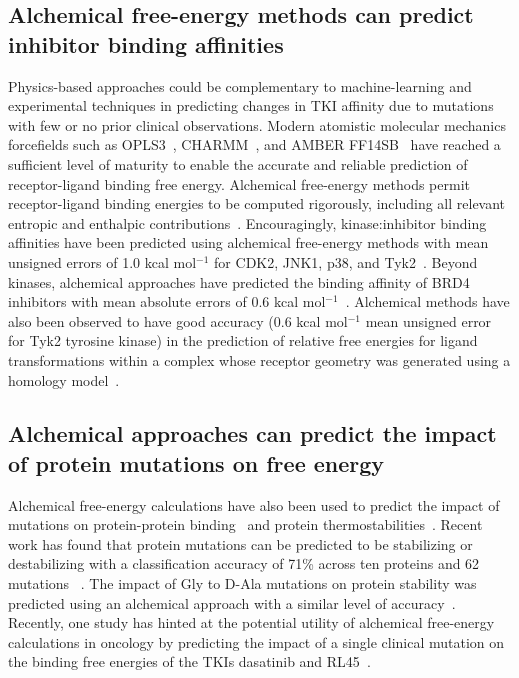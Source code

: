 \documentclass[phd,tocprelim]{cornell}
\begin{document}
\subsection{Alchemical free-energy methods can predict inhibitor binding affinities}
    Physics-based approaches could be complementary to machine-learning and experimental techniques in predicting changes in TKI affinity due to mutations with few or no prior clinical observations.
    Modern atomistic molecular mechanics forcefields such as OPLS3~\citep{Harder:J.Chem.TheoryComput.:2016}, CHARMM~\citep{Huang:J.Comput.Chem.:2013}, and AMBER FF14SB~\citep{Maier:J.Chem.TheoryComput.:2015} have reached a sufficient level of maturity to enable the accurate and reliable prediction of receptor-ligand binding free energy.
    Alchemical free-energy methods permit receptor-ligand binding energies to be computed rigorously, including all relevant entropic and enthalpic contributions~\citep{Chodera:Curr.Opin.Struct.Biol.:2011}.
    Encouragingly, kinase:inhibitor binding affinities have been predicted using alchemical free-energy methods with mean unsigned errors of 1.0 kcal mol$^{-1}$ for CDK2, JNK1, p38, and Tyk2~\citep{Wang:J.Am.Chem.Soc.:2015,abel2017accelerating}.
    Beyond kinases, alchemical approaches have predicted the binding affinity of BRD4 inhibitors with mean absolute errors of 0.6 kcal mol$^{-1}$~\citep{Aldeghi:ChemSci:2016}.
	Alchemical methods have also been observed to have good accuracy (0.6 kcal mol$^{-1}$ mean unsigned error for Tyk2 tyrosine kinase) in the prediction of relative free energies for ligand transformations within a complex whose receptor geometry was generated using a homology model~\citep{cappel2016}.


\subsection{Alchemical approaches can predict the impact of protein mutations on free energy}
	Alchemical free-energy calculations have also been used to predict the impact of mutations on protein-protein binding~\citep{clark2017free} and protein thermostabilities~\citep{steinbrecher2017predicting}.
	Recent work has found that protein mutations can be predicted to be stabilizing or destabilizing with a classification accuracy of 71\% across ten proteins and 62 mutations ~\citep{Ford:J.Chem.Inf.Model.:2017}.  
    The impact of Gly to D-Ala mutations on protein stability was predicted using an alchemical approach with a similar level of accuracy~\citep{Zou:J.Am.Chem.Soc.:2016}.
	Recently, one study has hinted at the potential utility of alchemical free-energy calculations in oncology by predicting the impact of a single clinical mutation on the binding free energies of the TKIs dasatinib and RL45~\citep{mondal2016}.
\end{document}
